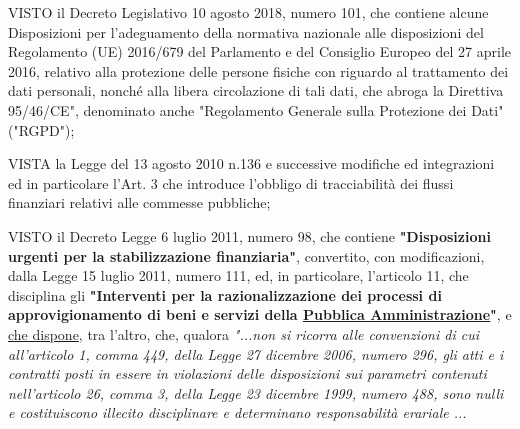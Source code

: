 \begin{list}{VALUTATA}{}
\item[VISTO]
il Decreto Legislativo 10 agosto 2018, numero 101, che contiene alcune Disposizioni per l’adeguamento
della normativa nazionale alle disposizioni del Regolamento (UE) 2016/679 del Parlamento e del Consiglio
Europeo del 27 aprile 2016, relativo alla protezione delle persone fisiche con riguardo al trattamento
dei dati personali, nonché alla libera circolazione di tali dati, che abroga la Direttiva 95/46/CE",
denominato anche "Regolamento Generale sulla Protezione dei Dati" ("RGPD");

\item[VISTA]
la Legge del 13 agosto 2010 n.136 e successive modifiche ed integrazioni ed in particolare l’Art. 3
che introduce l'obbligo di tracciabilità dei flussi finanziari relativi alle commesse pubbliche;

\item[VISTO]
il Decreto Legge 6 luglio 2011, numero 98, che contiene \textbf{"Disposizioni urgenti per la stabilizzazione
finanziaria"}, convertito, con modificazioni, dalla Legge 15 luglio 2011, numero 111, ed, in particolare,
l'articolo 11, che disciplina gli \textbf{"Interventi per la razionalizzazione dei processi di
approvigionamento di beni e servizi della \underline{Pubblica Amministrazione}"}, e \underline{che dispone},
tra l'altro, che, qualora \textit{"...non si ricorra alle convenzioni di cui all'articolo 1, comma 449,
della Legge 27 dicembre 2006, numero 296, gli atti e i contratti posti in essere in violazioni delle
disposizioni sui parametri contenuti nell'articolo 26, comma 3, della Legge 23 dicembre 1999, numero 488,
sono nulli e costituiscono illecito disciplinare e determinano responsabilità erariale ...}


\end{list}
